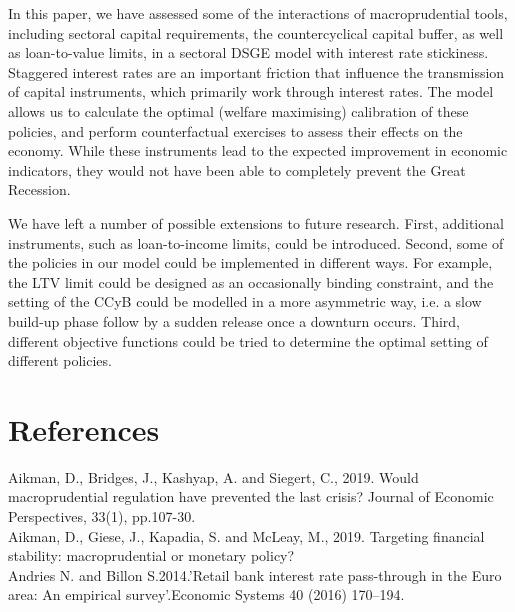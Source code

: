 \documentclass[12pt]{article}
\numberwithin{equation}{section}
\begin{document}
In this paper, we have assessed some of the interactions of macroprudential tools, including sectoral capital requirements, the countercyclical capital buffer, as well as loan-to-value limits, in a sectoral DSGE model with interest rate stickiness. Staggered interest rates are an important friction that influence the transmission of capital instruments, which primarily work through interest rates. The model allows us to calculate the optimal (welfare maximising) calibration of these policies, and perform counterfactual exercises to assess their effects on the economy. While these instruments lead to the expected improvement in economic indicators, they would not have been able to completely prevent the Great Recession.

We have left a number of possible extensions to future research. First, additional instruments, such as loan-to-income limits, could be introduced. Second, some of the policies in our model could be implemented in different ways. For example, the LTV limit could be designed as an occasionally binding constraint, and the setting of the CCyB could be modelled in a more asymmetric way, i.e. a slow build-up phase follow by a sudden release once a downturn occurs. Third, different objective functions could be tried to determine the optimal setting of different policies.
















\section{References}

\hspace*{0.6cm}

Aikman, D., Bridges, J., Kashyap, A. and Siegert, C., 2019. Would macroprudential regulation have prevented the last crisis? Journal of Economic Perspectives, 33(1), pp.107-30. \\

Aikman, D., Giese, J., Kapadia, S. and McLeay, M., 2019. Targeting financial stability: macroprudential or monetary policy? \\

Andries N. and Billon S.2014.'Retail bank interest rate pass-through in the Euro area: An empirical survey'.Economic Systems 40 (2016) 170–194.\\
\end{document}
